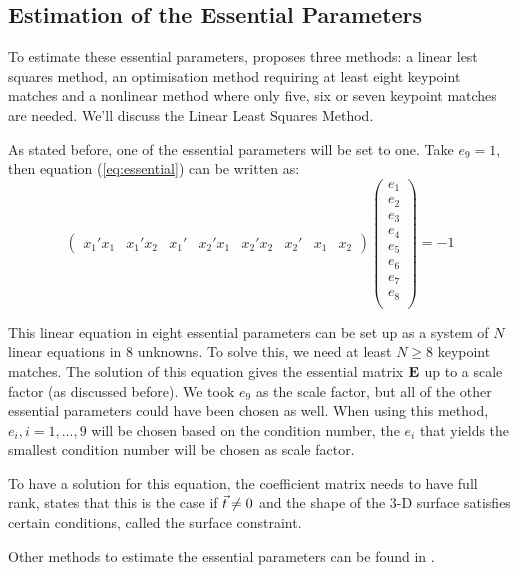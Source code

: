 \subsection{Estimation of the Essential Parameters}
To estimate these essential parameters, \cite{tekalp} proposes three methods: a linear lest squares method, an optimisation method requiring at least eight keypoint matches and a nonlinear method where only five, six or seven keypoint matches are needed. We'll discuss the Linear Least Squares Method.\bigskip

As stated before, one of the essential parameters will be set to one. Take $e_9 = 1$, then equation (\ref{eq:essential}) can be written as:
\begin{equation}
    \begin{pmatrix}
        x_1'x_1 &
        x_1'x_2 &
        x_1' &
        x_2'x_1 &
        x_2'x_2 &
        x_2' &
        x_1 &
        x_2
    \end{pmatrix}
    \begin{pmatrix}
        e_1 \\
        e_2 \\
        e_3 \\
        e_4 \\
        e_5 \\
        e_6 \\
        e_7 \\
        e_8 \\
    \end{pmatrix}
    = -1
\end{equation}

This linear equation in eight essential parameters can be set up as a system of $N$ linear equations in 8 unknowns. To solve this, we need at least $N \geq 8$ keypoint matches. The solution of this equation gives the essential matrix $\mathbf{E}$ up to a scale factor (as discussed before). We took $e_9$ as the scale factor, but all of the other essential parameters could have been chosen as well. When using this method, $e_i, i = 1,...,9$ will be chosen based on the condition number, the $e_i$ that yields the smallest condition number will be chosen as scale factor.

To have a solution for this equation, the coefficient matrix needs to have full rank, \cite{tekalp} states that this is the case if $\vec t \neq 0$ and the shape of the 3-D surface satisfies certain conditions, called the surface constraint.

Other methods to estimate the essential parameters can be found in \cite{tekalp}.

